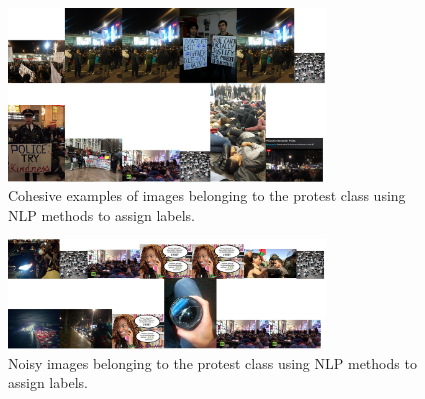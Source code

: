 \documentclass[twoside,11pt]{article}
\begin{document}
\begin{figure}[h]
\centering
\includegraphics[width=0.75\textwidth]{sample_images_good.png}
\caption{Cohesive examples of images belonging to the protest class using NLP methods to  assign labels.}
\label{im:good}
\end{figure}

\begin{figure}[h]
\centering
\includegraphics[width=0.75\textwidth]{sample_images_noise.png}
\caption{Noisy images belonging to the protest class using NLP methods to assign labels.}
\label{im:noisy}
\end{figure}
\end{document}
